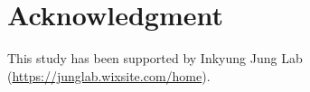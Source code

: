 \documentclass[aps, 10pt, a4paper]{article}
\begin{document}
    \section{Acknowledgment}
        This study has been supported by Inkyung Jung Lab (\url{https://junglab.wixsite.com/home}).
    
    
    

    
\end{document}
